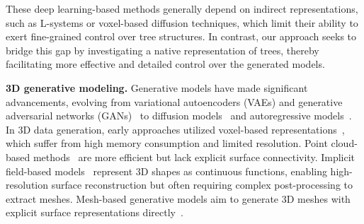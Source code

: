 

These deep learning-based methods generally depend on indirect representations, such as L-systems or voxel-based diffusion techniques, which limit their ability to exert fine-grained control over tree structures. In contrast, our approach seeks to bridge this gap by investigating a native representation of trees, thereby facilitating more effective and detailed control over the generated models.


\noindent\textbf{3D generative modeling.}
Generative models have made significant advancements, evolving from variational autoencoders (VAEs) \cite{kingma2013auto} and generative adversarial networks (GANs)~\cite{10.1145/3422622} to diffusion models~\cite{song2020score, ho2020denoising, Na:2024:LennardJonesLayer} and autoregressive models~\cite{esser2021taming}. 
In 3D data generation, early approaches utilized voxel-based representations~\cite{voxelhane2017hierarchical}, which suffer from high memory consumption and limited resolution. Point cloud-based methods~\cite{luo2021diffusion} are more efficient but lack explicit surface connectivity. Implicit field-based models~\cite{chen2019learning, zhang20233dshape2vecset,zhang2024lagem} represent 3D shapes as continuous functions, enabling high-resolution surface reconstruction but often requiring complex post-processing to extract meshes. Mesh-based generative models aim to generate 3D meshes with explicit surface representations directly~\cite{chen2020bsp,alliegro2023polydiff}. 

